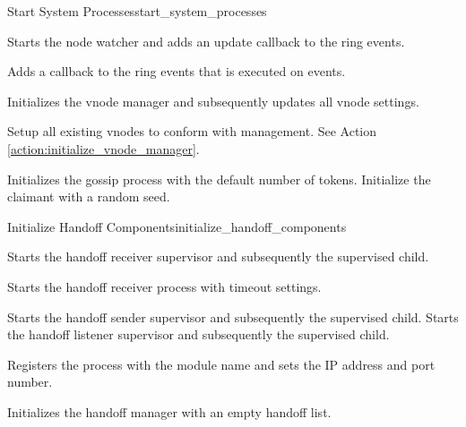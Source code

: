 \begin{actionbox}{Start System Processes}{start_system_processes}
\begin{action}
\begin{action}
		\end{action}
		 Starts the node watcher and adds an update callback to the ring events.
		\begin{action}
			 Adds a callback to the ring events that is executed on events.
		\end{action}
		 Initializes the vnode manager and subsequently updates all vnode settings.
		\begin{action}
			 Setup all existing vnodes to conform with management.
			See Action \ref{action:initialize_vnode_manager}.
		\end{action}
		 Initializes the gossip process with the default number of tokens.
		 Initialize the claimant with a random seed.
	\end{action}
\end{actionbox}

\begin{actionbox}{Initialize Handoff Components}{initialize_handoff_components}
	\begin{action}
		 Starts the handoff receiver supervisor and subsequently the supervised child.
		\begin{action}
			 Starts the handoff receiver process with timeout settings.
		\end{action}
		 Starts the handoff sender supervisor and subsequently the supervised child.
		 Starts the handoff listener supervisor and subsequently the supervised child.
		\begin{action}
			 Registers the process with the module name and sets the IP address and port number.
		\end{action}
		 Initializes the handoff manager with an empty handoff list.
	\end{action}
\end{actionbox}

